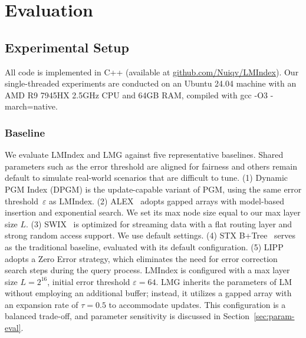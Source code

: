 \section{Evaluation}
\label{sec:evaluation}


\subsection{Experimental Setup}
All code is implemented in C++ (available at \url{github.com/Nuiqv/LMIndex}). Our single-threaded experiments are conducted on an Ubuntu 24.04 machine with an AMD R9 7945HX 2.5GHz CPU and 64GB RAM, compiled with gcc -O3 -march=native.

\subsubsection{Baseline} We evaluate LMIndex and LMG against five representative baselines. Shared parameters such as the error threshold are aligned for fairness and others remain default to simulate real-world scenarios that are difficult to tune. (1) Dynamic PGM Index (DPGM) \cite{pgm20} is the update-capable variant of PGM, using the same error threshold~$\varepsilon$ as LMIndex. (2) ALEX~\cite{alex20} adopts gapped arrays with model-based insertion and exponential search. We set its max node size equal to our max layer size $\mathit{L}$. (3) SWIX~\cite{swix24} is optimized for streaming data with a flat routing layer and strong random access support. We use default settings. (4) STX B+Tree~\cite{stxbtree19} serves as the traditional baseline, evaluated with its default configuration. (5) LIPP \cite{lipp21, learned23} adopts a Zero Error strategy, which eliminates the need for error correction search steps during the query process. LMIndex is configured with a max layer size $\mathit{L}=2^{16}$, initial error threshold $\varepsilon=64$. LMG inherits the parameters of LM without employing an additional buffer; instead, it utilizes a gapped array with an expansion rate of $\tau=0.5$ to accommodate updates. This configuration is a balanced trade-off, and parameter sensitivity is discussed in Section~\ref{sec:param-eval}.

